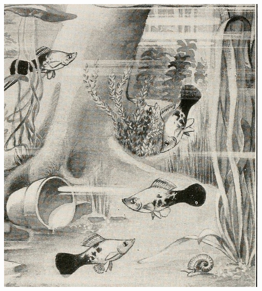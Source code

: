 {\begin{marginfigure}
\begin{center}
\includegraphics[width= \textwidth]{illustration_images/single_locus_selection/platyfish/Poecilid_Hybrid}
\end{center}
\caption{
  Poecilid Hybrid, {\it Xiphophorus helleri} $\times$ {\it Platypoecilus maculatus}.
} \label{fig:platyfish}
\end{marginfigure}

}

